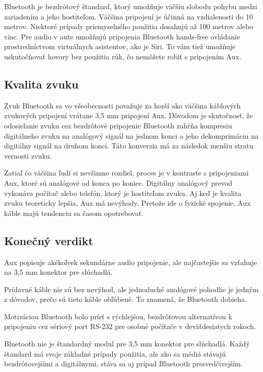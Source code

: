 \documentclass[10pt,twoside,slovak,a4paper]{article}
\begin{document}
Bluetooth je bezdrôtový štandard, ktorý umožňuje väčšiu slobodu pohybu medzi zariadením a jeho hostiteľom. Väčšina pripojení je účinná na vzdialenosti do 10 metrov. Niektoré prípady priemyselného použitia dosahujú až 100 metrov alebo viac. Pre audio v aute umožňujú pripojenia Bluetooth hands-free ovládanie prostredníctvom virtuálnych asistentov, ako je Siri. To vám tiež umožňuje uskutočňovať hovory bez použitia rúk, čo nemôžete robiť s pripojením Aux.

\subsection{Kvalita zvuku} \label {kvalita}

Zvuk Bluetooth sa vo všeobecnosti považuje za horší ako väčšina káblových zvukových pripojení vrátane 3,5 mm pripojení Aux. Dôvodom je skutočnosť, že odosielanie zvuku cez bezdrôtové pripojenie Bluetooth zahŕňa kompresiu digitálneho zvuku na analógový signál na jednom konci a jeho dekomprimáciu na digitálny signál na druhom konci. Táto konverzia má za následok menšiu stratu vernosti zvuku.

Zatiaľ čo väčšina ľudí si nevšimne rozdiel, proces je v kontraste s pripojeniami Aux, ktoré sú analógové od konca po koniec. Digitálny analógový prevod vykonáva počítač alebo telefón, ktorý je hostiteľom zvuku. Aj keď je kvalita zvuku teoreticky lepšia, Aux má nevýhody. Pretože ide o fyzické spojenie, Aux káble majú tendenciu sa časom opotrebovať.

\subsection{Konečný verdikt}\label{verdikt}

Aux popisuje akékoľvek sekundárne audio pripojenie, ale najčastejšie sa vzťahuje na 3,5 mm konektor pre slúchadlá.

Prídavné káble nie sú bez nevýhod, ale jednoduché analógové pohodlie je jedným z dôvodov, prečo sú tieto káble obľúbené. To znamená, že Bluetooth dobieha.

Motiváciou Bluetooth bolo prísť s rýchlejšou, bezdrôtovou alternatívou k pripojeniu cez sériový port RS-232 pre osobné počítače v deväťdesiatych rokoch.

Bluetooth nie je štandardný modul pre 3,5 mm konektor pre slúchadlá. Každý štandard má svoje základné prípady použitia, ale ako sa médiá stávajú bezdrôtovejšími a digitálnymi, stáva sa aj prípad Bluetooth presvedčivejším.
\end{document}
